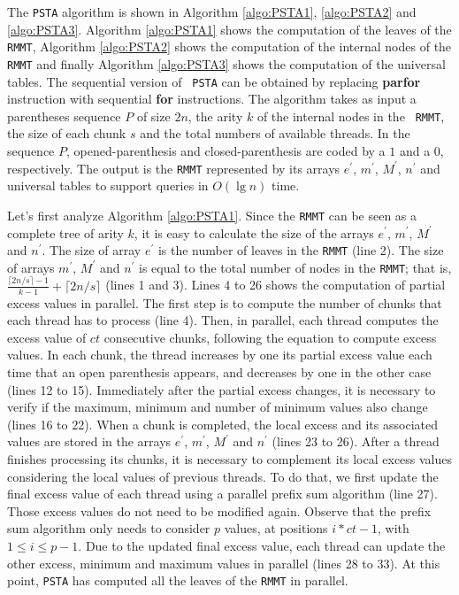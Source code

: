 The {\tt PSTA} algorithm is shown in Algorithm \ref{algo:PSTA1},
\ref{algo:PSTA2} and \ref{algo:PSTA3}. Algorithm \ref{algo:PSTA1}
shows the computation of the leaves of the {\tt RMMT}, Algorithm
\ref{algo:PSTA2} shows the computation of the internal nodes of the
{\tt RMMT} and finally Algorithm \ref{algo:PSTA3} shows the
computation of the universal tables. The sequential version of {\tt
  PSTA} can be obtained by replacing {\bf parfor} instruction with
sequential {\bf for} instructions. The algorithm takes as input a parentheses
sequence $P$ of size $2n$, the arity $k$ of the internal nodes in the {\tt
  RMMT}, the size of each chunk $s$ and the total numbers of available
threads. In the sequence $P$, opened-parenthesis and
closed-parenthesis are coded by a $1$ and a $0$, respectively. The
output is the {\tt RMMT} represented by its arrays $e^{\prime}$,
$m^{\prime}$, $M^{\prime}$, $n^{\prime}$ and universal tables to
support queries in $O(\lg n)$ time.

Let's first analyze Algorithm \ref{algo:PSTA1}. Since the {\tt RMMT}
can be seen as a complete tree of arity $k$, it is easy to calculate
the size of the arrays $e^{\prime}$, $m^{\prime}$, $M^{\prime}$ and
$n^{\prime}$. The size of array $e^{\prime}$ is the number of leaves
in the {\tt RMMT} (line 2). The size of arrays $m^{\prime}$,
$M^{\prime}$ and $n^{\prime}$ is equal to the total number of nodes in
the {\tt RMMT}; that is, $\frac{\lceil 2n/s \rceil-1}{k-1} + \lceil
2n/s \rceil$ (lines 1 and 3). Lines 4 to 26 shows the computation of
partial excess values in parallel. The first step is to compute the
number of chunks that each thread has to process (line 4). Then, in
parallel, each thread computes the excess value of $ct$ consecutive
chunks, following the equation to compute excess values. In each chunk, the
thread increases by one its partial excess value each time that an
open parenthesis appears, and decreases by one in the other case
(lines 12 to 15). Immediately after the partial excess changes, it is
necessary to verify if the maximum, minimum and number of minimum
values also change (lines 16 to 22). When a chunk is completed, the
local excess and its associated values are stored in the arrays
$e^{\prime}$, $m^{\prime}$, $M^{\prime}$ and $n^{\prime}$ (lines 23 to
26). After a thread finishes processing its chunks, it is necessary to
complement its local excess values considering the local values of
previous threads. To do that, we first update the final excess value
of each thread using a parallel prefix sum algorithm (line 27). 
Those excess values do not need to be modified again. Observe that
the prefix sum algorithm only needs to consider $p$ values, at positions
$i*ct-1$, with $1\leq i \leq p-1$. Due to the updated final excess value,
each thread can update the other excess, minimum and maximum values in
parallel (lines 28 to 33). At this point, {\tt PSTA} has computed all
the leaves of the {\tt RMMT} in parallel.

